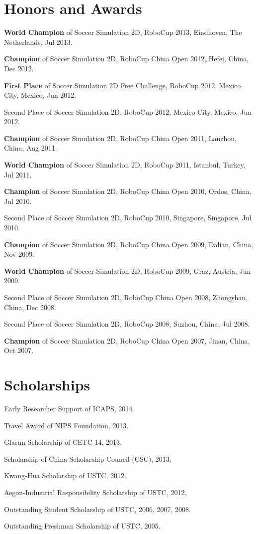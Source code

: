 \documentclass[letterpaper, fontset=adobe, 10pt]{ctexart}
\renewenvironment{itemize}{
  \begin{list}{}{
    \setlength{\leftmargin}{1.5em}
  }
}{
  \end{list}
}
\begin{document}
\section*{Honors and Awards}
\begin{itemize}
	\item {\bf World Champion} of Soccer Simulation 2D, RoboCup 2013, Eindhoven, The Netherlands, Jul 2013.
	\item {\bf Champion} of Soccer Simulation 2D, RoboCup China Open 2012, Hefei, China, Dec 2012.
	\item {\bf First Place} of Soccer Simulation 2D Free Challenge, RoboCup 2012, Mexico City, Mexico, Jun 2012.
	\item Second Place of Soccer Simulation 2D, RoboCup 2012, Mexico City, Mexico, Jun 2012.
	\item {\bf Champion} of Soccer Simulation 2D, RoboCup China Open 2011, Lanzhou, China, Aug 2011.
	\item {\bf World Champion} of Soccer Simulation 2D, RoboCup 2011, Istanbul, Turkey, Jul 2011.
	\item {\bf Champion} of Soccer Simulation 2D, RoboCup China Open 2010, Ordos, China, Jul 2010.
	\item Second Place of Soccer Simulation 2D, RoboCup 2010, Singapore, Singapore, Jul 2010.
	\item {\bf Champion} of Soccer Simulation 2D, RoboCup China Open 2009, Dalian, China, Nov 2009.
	\item {\bf World Champion} of Soccer Simulation 2D, RoboCup 2009, Graz, Austria, Jun 2009.
	\item Second Place of Soccer Simulation 2D, RoboCup China Open 2008, Zhongshan, China, Dec 2008.
	\item Second Place of Soccer Simulation 2D, RoboCup 2008, Suzhou, China, Jul 2008.
	\item {\bf Champion} of Soccer Simulation 2D, RoboCup China Open 2007, Jinan, China, Oct 2007.
\end{itemize}

\vspace{20pt}
\section*{Scholarships}
\begin{itemize}
	\item Early Researcher Support of ICAPS, 2014.
	\item Travel Award of NIPS Foundation, 2013.
	\item Glarun Scholarship of CETC-14, 2013.
	\item Scholarship of China Scholarship Council (CSC), 2013.
	\item Kwang-Hua Scholarship of USTC, 2012.
	\item Aegon-Industrial Responsibility Scholarship of USTC, 2012.
	\item Outstanding Student Scholarship of USTC, 2006, 2007, 2008.
	\item Outstanding Freshman Scholarship of USTC, 2005.
\end{itemize}
\end{document}
